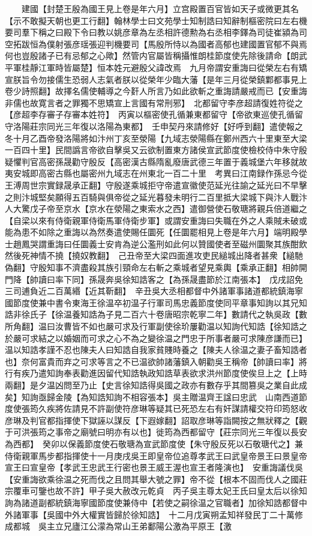 　　建國【封楚王殷為國王見上卷是年六月】立宫殿置百官皆如天子或微更其名【示不敢擬天朝也更工行翻】翰林學士曰文苑學士知制誥曰知辭制樞密院曰左右機要司羣下稱之曰殿下令曰教以姚彦章為左丞相許德勲為右丞相李鐸為司徒崔潁為司空拓跋恒為僕射張彦瑶張迎判機要司【馬殷所恃以為國者高郁也建國置官郁不與焉何也豈殷諸子已有忌郁之心歟】然管内官屬皆稱攝惟朗桂節度使先除後請命【朗武平軍桂靜江軍時皆屬楚】恒本姓元避殷父諱改焉　九月帝謂安重誨曰從榮左右有矯宣朕旨令勿接儒生恐弱人志氣者朕以從榮年少臨大藩【是年三月從榮鎮鄴都事見上卷少詩照翻】故擇名儒使輔導之今姧人所言乃如此欲斬之重誨請嚴戒而已【安重誨非儒也故寛言者之罪獨不思矯宣上言國有常刑邪】　北都留守李彦超請復姓符從之【彦超李存審子存審本姓符】　丙寅以樞密使孔循兼東都留守【帝欲東巡使孔循留守洛陽莊宗同光三年復以洛陽為東都】　壬申契丹來請修好【好呼到翻】遣使報之　冬十月乙酉帝發洛陽將如汴州丁亥至滎陽【九域志滎陽縣在鄭州西六十里東至大梁一百四十里】民間譌言帝欲自擊吳又云欲制置東方諸侯宣武節度使檢校侍中朱守殷疑懼判官高密孫晟勸守殷反【高密漢古縣隋亂廢唐武德三年置于義城堡六年移就故夷安城即高密古縣也屬密州九域志在州東北一百二十里　考異曰江南録作孫忌今從王溥周世宗實録晟承正翻】守殷遂乘城拒守帝遣宣徽使范延光往諭之延光曰不早擊之則汴城堅矣願得五百騎與俱帝從之延光暮發未明行二百里抵大梁城下與汴人戰汴人大驚戊子帝至京水【京水在滎陽之東索水之西】遣御營使石敬瑭將親兵倍道繼之【自梁以來有侍衛親軍侍衛馬軍侍衛步軍】或謂安重誨曰失職在外之人乘賊未破或能為患不如除之重誨以為然奏遣使賜任圜死【任圜罷相見上卷是年六月】端明殿學士趙鳳哭謂重誨曰任圜義士安肯為逆公濫刑如此何以贊國使者至磁州圜聚其族酣飲然後死神情不撓【撓奴教翻】　己丑帝至大梁四面進攻吏民縋城出降者甚衆【縋馳偽翻】守殷知事不濟盡殺其族引頸命左右斬之乘城者望見乘輿【乘承正翻】相帥開門降【帥讀曰率下同】孫晟奔吳徐知誥客之【為孫晟盡節於江南張本】　戊戌詔免三司逋負近二百萬緡【近其靳翻】　辛丑吳大丞相都督中外諸軍事諸道都統鎮海寧國節度使兼中書令東海王徐温卒初温子行軍司馬忠義節度使同平章事知詢以其兄知誥非徐氏子【徐温養知誥為子見二百六十卷唐昭宗乾寧二年】數請代之執吳政【數所角翻】温曰汝曹皆不如也嚴可求及行軍副使徐玠屢勸温以知詢代知誥【徐知誥之於嚴可求結之以婚姻而可求之心不為之變徐温之門忠于所事者嚴可求陳彦謙而已】温以知誥孝謹不忍也陳夫人曰知誥自我家貧賤時養之【陳夫人徐温之妻子畜知誥者也】奈何富貴而弃之可求等言之不已温欲帥諸藩鎮入朝勸吳王稱帝【帥讀曰率】將行有疾乃遣知詢奉表勸進因留代知誥執政知誥草表欲求洪州節度使俟旦上之【上時兩翻】是夕温凶問至乃止【史言徐知誥得吳國之政亦有數存乎其間篡吳之業自此成矣】知詢亟歸金陵【為知誥知詢不相容張本】吳主贈温齊王諡曰忠武　山南西道節度使張筠久疾將佐請見不許副使符彦琳等疑其已死恐左右有奸謀請權交符印筠怒收彦琳及判官都指揮使下獄誣以謀反【下遐嫁翻】詔取彦琳等詣闕按之無狀釋之【觀于可洪張筠之事帝之廟號曰明亦有以也】徙筠為西都留守【莊宗同光三年復以長安為西都】　癸卯以保義節度使石敬瑭為宣武節度使【朱守殷反死以石敬瑭代之】兼侍衛親軍馬步都指揮使十一月庚戌吳王即皇帝位追尊孝武王曰武皇帝景王曰景皇帝宣王曰宣皇帝【孝武王忠武王行密也景王威王渥也宣王者隆演也】　安重誨議伐吳【安重誨欲乘徐温之死而伐之且問其舉大號之罪】帝不從【根本不固而伐人之國莊宗覆車可鑒也故不許】甲子吳大赦改元乾貞　丙子吳主尊太妃王氏曰皇太后以徐知詢為諸道副都統鎮海寧國節度使兼侍中【若使之嗣徐温之官職者】加徐知誥都督中外諸軍事【吳國中外大權實皆歸於徐知誥】　十二月戊寅朔孟知祥發民丁二十萬修成都城　吳主立兄廬江公濛為常山王弟鄱陽公激為平原王【激